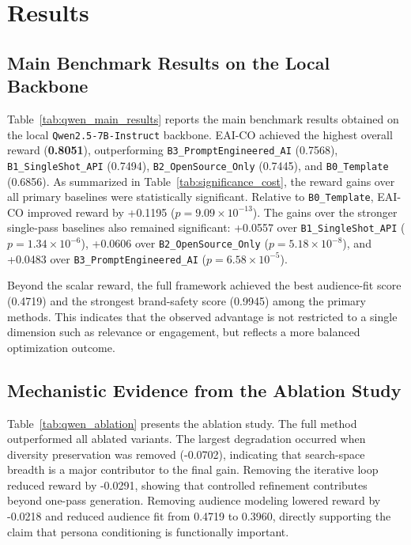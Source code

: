 \documentclass[applsci,article,submit,pdftex,moreauthors]{Definitions/mdpi}
\begin{document}


\section{Results}

\subsection{Main Benchmark Results on the Local Backbone}

Table~\ref{tab:qwen_main_results} reports the main benchmark results obtained on the local \texttt{Qwen2.5-7B-Instruct} backbone. EAI-CO achieved the highest overall reward (\textbf{0.8051}), outperforming \texttt{B3\_PromptEngineered\_AI} (0.7568), \texttt{B1\_SingleShot\_API} (0.7494), \texttt{B2\_OpenSource\_Only} (0.7445), and \texttt{B0\_Template} (0.6856). As summarized in Table~\ref{tab:significance_cost}, the reward gains over all primary baselines were statistically significant. Relative to \texttt{B0\_Template}, EAI-CO improved reward by +0.1195 ($p = 9.09 \times 10^{-13}$). The gains over the stronger single-pass baselines also remained significant: +0.0557 over \texttt{B1\_SingleShot\_API} ($p = 1.34 \times 10^{-6}$), +0.0606 over \texttt{B2\_OpenSource\_Only} ($p = 5.18 \times 10^{-8}$), and +0.0483 over \texttt{B3\_PromptEngineered\_AI} ($p = 6.58 \times 10^{-5}$).

Beyond the scalar reward, the full framework achieved the best audience-fit score (0.4719) and the strongest brand-safety score (0.9945) among the primary methods. This indicates that the observed advantage is not restricted to a single dimension such as relevance or engagement, but reflects a more balanced optimization outcome.

\subsection{Mechanistic Evidence from the Ablation Study}

Table~\ref{tab:qwen_ablation} presents the ablation study. The full method outperformed all ablated variants. The largest degradation occurred when diversity preservation was removed (-0.0702), indicating that search-space breadth is a major contributor to the final gain. Removing the iterative loop reduced reward by -0.0291, showing that controlled refinement contributes beyond one-pass generation. Removing audience modeling lowered reward by -0.0218 and reduced audience fit from 0.4719 to 0.3960, directly supporting the claim that persona conditioning is functionally important.
\end{document}
